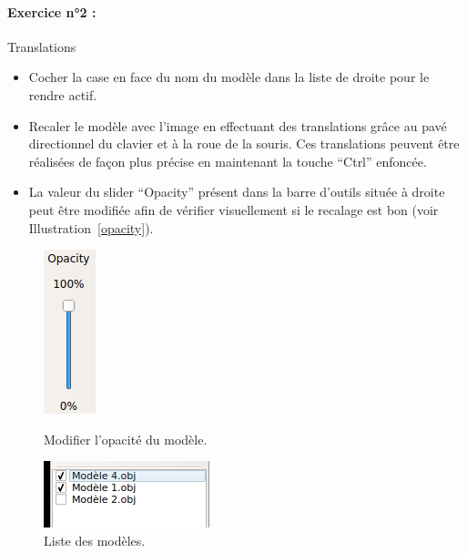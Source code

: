 \documentclass[12pt]{report}
\begin{document}
\begin{appendices}
\paragraph{Exercice n°2 :}Translations
\begin{itemize}
\item Cocher la case en face du nom du modèle dans la liste de droite pour le rendre actif.
\item Recaler le modèle avec l'image en effectuant des translations grâce au pavé directionnel du clavier et à la roue de la souris. Ces translations peuvent être réalisées de façon plus précise en maintenant la touche ``Ctrl'' enfoncée.
\item La valeur du slider ``Opacity'' présent dans la barre d'outils située à droite peut être modifiée afin de vérifier visuellement si le recalage est bon (voir Illustration~\ref{opacity}).
\end{itemize}
	
\begin{figure}[H]
\centerline{\includegraphics[scale = 0.5]{img/opacitySlider.png}}
\caption{Modifier l'opacité du modèle.}
\label{opacity}
\endminipage\hfill
{}
\centerline{\includegraphics[scale = 1]{img/modelsListExercices.png}}
\caption{Liste des modèles.}
\label{list}
\endminipage
\end{figure}
		

\end{appendices}
\end{document}
